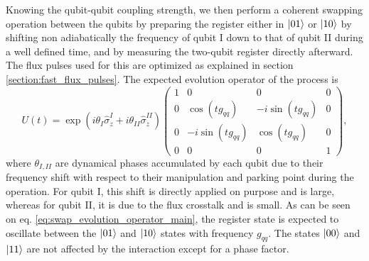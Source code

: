 Knowing the qubit-qubit coupling strength, we then perform a coherent swapping operation between the qubits by preparing the register either in $\left| 01 \right>$ or $\left| 10 \right>$ by shifting non adiabatically the frequency of qubit I down to that of qubit II during a well defined time, and by measuring the two-qubit register directly afterward. The flux pulses used for this are optimized as explained in section \ref{section:fast_flux_pulses}. The expected evolution operator of the process is
%
\begin{equation}
U(t)=\exp{\left(i\theta_I\hat{\sigma}_z^I+i\theta_{II}\hat{\sigma}_z^{II}\right)}\left(\begin{array}{cccc}
1 & 0 & 0 & 0\\
0 & \cos{(tg_{qq})} & -i\sin{(tg_{qq})} & 0\\
0 & -i\sin{(tg_{qq})} & \cos{(tg_{qq})} & 0\\
0 & 0 & 0 & 1\end{array}\right), \label{eq:swap_evolution_operator_main}
\end{equation}
%
where $\theta_{I,II}$ are dynamical phases accumulated by each qubit due to their frequency shift with respect to their manipulation and parking point  during the operation. For qubit I, this shift is directly applied on purpose and is large, whereas for qubit II, it is due to the flux crosstalk and is small. As can be seen on eq. \ref{eq:swap_evolution_operator_main}, the register state is expected to oscillate between the $\left| 01 \right>$ and $\left| 10 \right>$ states with frequency $g_{qq}$. The states $\left| 00 \right>$ and $\left| 11 \right>$ are not affected by the interaction except for a phase factor.

\smallskip

